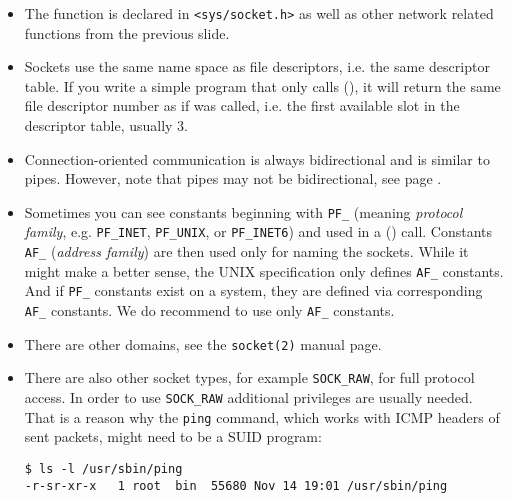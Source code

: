 \begin{itemize}
\item The function is declared in \texttt{<sys/socket.h>} as well as other
network related functions from the previous slide.
\item Sockets use the same name space as file descriptors, i.e. the same
descriptor table.  If you write a simple program that only calls
(), it will return the same file descriptor number as if
 was called, i.e. the first available slot in the descriptor
table, usually 3.
\item Connection-oriented communication is always bidirectional and is similar
to pipes.  However, note that pipes may not be bidirectional, see page
\pageref{TWO_WAY_PIPES}.
\item Sometimes you can see constants beginning with \verb#PF_# (meaning
\emph{protocol family}, e.g. \texttt{PF\_IN\-ET}, \verb#PF_UNIX#, or
\texttt{PF\_IN\-ET6}) and used in a () call. Constants \verb#AF_#
(\emph{address family}) are then used only for naming the sockets.  While it
might make a better sense, the UNIX specification only defines \verb#AF_#
constants.  And if \verb#PF_# constants exist on a system, they are defined via
corresponding \verb#AF_# constants.  We do recommend to use only \verb#AF_#
constants.
\item There are other domains, see the \texttt{socket(2)} manual page.
\item There are also other socket types, for example \texttt{SOCK\_RAW}, for
full protocol access. In order to use \texttt{SOCK\_RAW} additional privileges
are usually needed.  That is a reason why the \texttt{ping} command, which
works with ICMP headers of sent packets, might need to be a SUID program:

\begin{verbatim}
$ ls -l /usr/sbin/ping
-r-sr-xr-x   1 root  bin  55680 Nov 14 19:01 /usr/sbin/ping
\end{verbatim}
\end{itemize}



